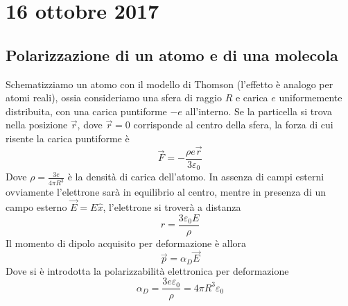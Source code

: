 \documentclass[a4paper,11pt]{book}
\let\oldepsilon\epsilon
\let\oldvarepsilon\varepsilon
\renewcommand{\epsilon}{\oldvarepsilon}
\renewcommand{\varepsilon}{\oldepsilon}
\theoremstyle{definition}
\theoremstyle{theorem}
\begin{document}
\section{16 ottobre 2017}
\subsection{Polarizzazione di un atomo e di una molecola}
Schematizziamo un atomo con il modello di Thomson (l'effetto è analogo per atomi reali), ossia consideriamo una sfera di raggio $R$ e carica $e$ uniformemente distribuita, con una carica puntiforme $-e$ all'interno. Se la particella si trova nella posizione $\vec{r}$, dove $\vec{r}=0$ corrisponde al centro della sfera, la forza di cui risente la carica puntiforme è
\[\vec{F}=-\frac{\rho e\vec{r}}{3\epsilon_0}\]
Dove $\rho=\frac{3e}{4\pi R^3}$ è la densità di carica dell'atomo. In assenza di campi esterni ovviamente l'elettrone sarà in equilibrio al centro, mentre in presenza di un campo esterno $\vec{E}=E\hat{x}$, l'elettrone si troverà a distanza
\[r=\frac{3\epsilon_0 E}{\rho }\]
Il momento di dipolo acquisito per deformazione è allora
\[\vec{p}=\alpha_D\vec{E}\]
Dove si è introdotta la polarizzabilità elettronica per deformazione
\[\alpha_D=\frac{3e\epsilon_0}{\rho}=4\pi R^3\epsilon_0\]
\end{document}
